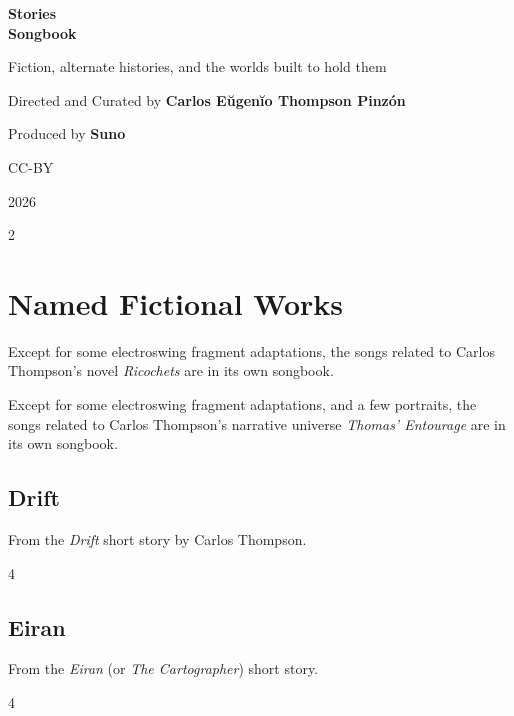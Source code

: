 \documentclass[a4paper,landscape]{memoir}
\begin{document}
\frontmatter
{}

\begin{titlingpage}
\centering
\vspace*{\fill}
{\LARGE\bfseries Stories\\\Huge Songbook\par}
\bigskip
{\large Fiction, alternate histories, and the worlds built to hold them\par}
\vspace*{\fill}
{\normalsize Directed and Curated by \bfseries Carlos Eŭgenĭo Thompson Pinzón\par}
{\normalsize Produced by \bfseries Suno\par}
\bigskip
{\normalsize CC-BY\par}
{\normalsize 2026\par}
\vspace*{\fill}
\end{titlingpage}

\clearpage\begin{multicols*}{2}
\tableofcontents*
\end{multicols*}
\mainmatter
\renewcommand\chaptername{Album~}

\part{Named Fictional Works}

Except for some electroswing fragment adaptations, the songs related to Carlos Thompson's novel \emph{Ricochets} are in its own songbook.

Except for some electroswing fragment adaptations, and a few portraits, the songs related to Carlos Thompson's narrative universe \emph{Thomas' Entourage} are in its own songbook.

\chapter{Drift}
From the \emph{Drift} short story by Carlos Thompson.
\clearpage\begin{multicols*}{4}





\end{multicols*}

\chapter{Eiran}
From the \emph{Eiran} (or \emph{The Cartographer}) short story.
\clearpage\begin{multicols*}{4}




\end{multicols*}
\end{document}
